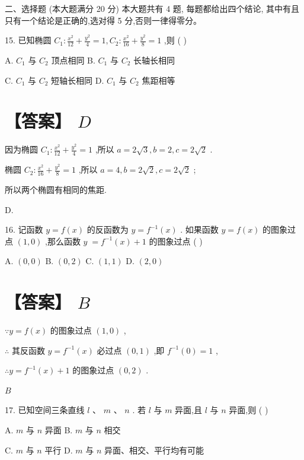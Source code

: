 \documentclass[10pt]{article}
\begin{document}
二、选择题 (本大题满分 20 分) 本大题共有 4 题, 每题都给出四个结论, 其中有且只有一个结论是正确的,选对得 5 分,否则一律得零分。

15. 已知椭圆 \({C}_{1} : \frac{{x}^{2}}{12} + \frac{{y}^{2}}{4} = 1,{C}_{2} : \frac{{x}^{2}}{16} + \frac{{y}^{2}}{8} = 1\) ,则 ( )

A. \({C}_{1}\) 与 \({C}_{2}\) 顶点相同 B. \({C}_{1}\) 与 \({C}_{2}\) 长轴长相同

C. \({C}_{1}\) 与 \({C}_{2}\) 短轴长相同 D. \({C}_{1}\) 与 \({C}_{2}\) 焦距相等

\section*{【答案】 \(D\)}

因为椭圆 \({C}_{1} : \frac{{x}^{2}}{12} + \frac{{y}^{2}}{4} = 1\) ,所以 \(a = 2\sqrt{3},b = 2,c = 2\sqrt{2}\) .

椭圆 \({C}_{2} : \frac{{x}^{2}}{16} + \frac{{y}^{2}}{8} = 1\) ,所以 \(a = 4,b = 2\sqrt{2},c = 2\sqrt{2}\) ;

所以两个椭圆有相同的焦距.

D.

16. 记函数 \(y = f\left( x\right)\) 的反函数为 \(y = {f}^{-1}\left( x\right)\) . 如果函数 \(y = f\left( x\right)\) 的图象过点 \(\left( {1,0}\right)\) ,那么函数 \(y \; = {f}^{-1}\left( x\right)  + 1\) 的图象过点 ( )

A. \(\left( {0,0}\right)\) B. \(\left( {0,2}\right)\) C. \(\left( {1,1}\right)\) D. \(\left( {2,0}\right)\)

\section*{【答案】 \(B\)}

\(\because y = f\left( x\right)\) 的图象过点 \(\left( {1,0}\right)\) ,

\(\therefore\) 其反函数 \(y = {f}^{-1}\left( x\right)\) 必过点 \(\left( {0,1}\right)\) ,即 \({f}^{-1}\left( 0\right)  = 1\) ,

\(\therefore y = {f}^{-1}\left( x\right)  + 1\) 的图象过点 \(\left( {0,2}\right)\) .

\(B\)

17. 已知空间三条直线 \(l\text{ 、 }m\text{ 、 }n\) . 若 \(l\) 与 \(m\) 异面,且 \(l\) 与 \(n\) 异面,则 ( )

A. \(m\) 与 \(n\) 异面 B. \(m\) 与 \(n\) 相交

C. \(m\) 与 \(n\) 平行 D. \(m\) 与 \(n\) 异面、相交、平行均有可能
\end{document}
